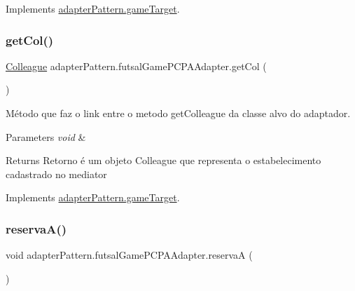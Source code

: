 Implements \mbox{\hyperlink{interfaceadapter_pattern_1_1game_target_a32fce3f3dd420116a031b051f2464304}{adapter\+Pattern.\+game\+Target}}.

\mbox{\label{classadapter_pattern_1_1futsal_game_p_c_p_a_adapter_a8b104bff8d91fbd51df1a498a38a67f3}} 
\subsubsection{\texorpdfstring{getCol()}{getCol()}}
{\footnotesize\ttfamily \mbox{\hyperlink{classmediator_pattern_1_1_colleague}{Colleague}} adapter\+Pattern.\+futsal\+Game\+P\+C\+P\+A\+Adapter.\+get\+Col (\begin{DoxyParamCaption}{ }\end{DoxyParamCaption})}



Método que faz o link entre o metodo get\+Colleague da classe alvo do adaptador. 


\begin{DoxyParams}{Parameters}
{\em void} & \\
\hline
\end{DoxyParams}
\begin{DoxyReturn}{Returns}
Retorno é um objeto Colleague que representa o estabelecimento cadastrado no mediator 
\end{DoxyReturn}


Implements \mbox{\hyperlink{interfaceadapter_pattern_1_1game_target_ad3fc8b4c4a732bcc875071ed0c081261}{adapter\+Pattern.\+game\+Target}}.

\mbox{\label{classadapter_pattern_1_1futsal_game_p_c_p_a_adapter_aef67583c8fe4f45e6309ccd4c8732c4a}} 
\subsubsection{\texorpdfstring{reservaA()}{reservaA()}}
{\footnotesize\ttfamily void adapter\+Pattern.\+futsal\+Game\+P\+C\+P\+A\+Adapter.\+reservaA (\begin{DoxyParamCaption}{ }\end{DoxyParamCaption})}



